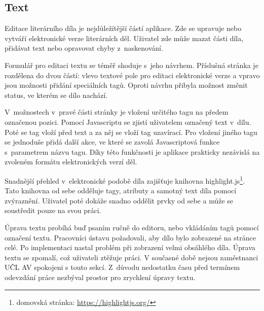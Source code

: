         \subsection{Text}
            Editace literárního díla je nejdůležítější částí aplikace. Zde se upravuje nebo vytváří elektronické verze literárních děl. Uživatel zde může mazat části díla, přidávat text nebo opravovat chyby z~naskenování.
            
            Formulář pro editaci textu se téměř shoduje s~jeho návrhem. Příslušná stránka je rozdělena do dvou částí: vlevo textové pole pro editaci elektronické verze a vpravo jsou možnosti přidání speciálních tagů. Oproti návrhu přibyla možnost změnit status, ve kterém se dílo nachází.
            
            V~možnostech v~pravé části stránky je vložení určitého tagu na předem označenou pozici. Pomocí Javascriptu se zjistí uživatelem označený text v~dílu. Poté se tag vloží před text a za něj se vloží tag uzavírací. Pro vložení jiného tagu se jednoduše přidá další akce, ve které se zavolá Javascriptová funkce s~parametrem názvu tagu. Díky této funkčnosti je aplikace prakticky nezávislá na zvoleném formátu elektronických verzí děl.
            
            Snadnější přehled v~elektronické podobě díla zajišťuje knihovna highlight.js\footnote{domovská stránka: \url{https://highlightjs.org/}}. Tato knihovna od sebe odděluje tagy, atributy a samotný text díla pomocí zvýraznění. Uživatel poté dokáže snadno oddělit prvky od sebe a může se soustředit pouze na svou práci.
            
            Úprava textu probíhá buď psaním ručně do editoru, nebo vkládáním tagů pomocí označení textu. Pracovníci ústavu požadovali, aby dílo bylo zobrazené na stránce celé. Po implementaci nastal problém při zobrazení velmi obsáhlého díla. Úprava textu se zpomalí, což uživateli ztěžuje práci. V současné době nejsou zaměstnanci UČL AV spokojeni s touto sekcí. Z~důvodu nedostatku času před termínem odevzdání práce nezbýval prostor pro zrychlení úpravy textu.
